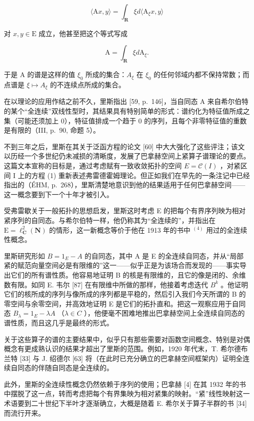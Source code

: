 \[
\langle \mathrm{A} x, y \rangle = \int_ {\mathbf {R}} \xi d \langle \mathrm{A} _ {\xi} x, y \rangle
\]

对 \(x, y \in \mathrm{E}\) 成立，他甚至把这个等式写成

\[
\mathrm{A} = \int_ {\mathbf {R}} \xi d \mathrm{A} _ {\xi}.
\]

于是 A 的谱是这样的值 \(\xi_{0}\) 所成的集合：\(A_{\xi}\) 在 \(\xi_{0}\) 的任何邻域内都不保持常数；而点谱是 \(\xi \mapsto A_{\xi}\) 的不连续点所成的集合。

在以理论的应用作结之前不久，里斯指出 [59, p.~146]，当自同态 A 来自希尔伯特的某个“全连续”双线性型时，其结果具有特别简单的形式：谱约化为特征值所成之集（可能还须加上 0），特征值排成一个趋于 0 的序列，且每个非零特征值的重数是有限的（III, p.~90, 命题 5）。


不到三年之后，里斯在其关于泛函方程的论文 [60] 中大大强化了这些评注；该文以历经一个多世纪仍未减损的清晰度，发展了巴拿赫空间上紧算子谱理论的要点。这篇文本宣称的目标是，通过考虑赋有一致收敛拓扑的空间 \(E = \mathcal{C}(I)\) ，对紧区间 I 上的方程 (1) 重新表述弗雷德霍姆理论。但正如我们在早先的一条注记中已经指出的（ÉHM, p.~268），里斯清楚地意识到他的结果适用于任何巴拿赫空间——这一概念要到下一个十年才被引入。

受弗雷歇关于一般拓扑的思想启发，里斯这时考虑 E 的把每个有界序列映为相对紧序列的自同态。与希尔伯特一样，他仍称其为“全连续的”，并指出在 \(\mathrm{E} = \ell_{\mathbf{C}}^{2}(\mathbf{N})\) 的情形，这一新概念等价于他在 1913 年的书中 \(^{(4)}\) 用过的全连续性概念。

里斯研究形如 \(B = 1_{E} - A\) 的自同态，其中 A 是 E 的全连续自同态，并从“局部紧的赋范向量空间必是有限维的”这一——似乎正是为该场合而发现的——事实导出它们的所有谱性质。他容易地证明 B 的核是有限维的，且它的像是闭的、余维数有限。如同 E. 韦尔 [87] 在有限维中所做的那样，他接着考虑迭代 \(B^{k}\) 。他证明它们的核所成的序列与像所成的序列都是平稳的，然后引入我们今天所谓的 B 的零空间与余零空间，并高效地证明 E 是它们的拓扑直和。把这一观察应用于自同态 \(B_{\lambda} = 1_{E} - \lambda A\) （\(\lambda \in C\) ），他便毫不困难地推出巴拿赫空间上全连续自同态的谱性质，而且这几乎是最终的形式。

关于这些算子的谱的主要结果中，似乎只有那些需要对函数空间概念、特别是对偶概念有更成熟认识的结果才超出了里斯的范围。例如，1920 年代末，T. 希尔德布兰特 [33] 与 J. 绍德尔 [63] 将（在此时已充分确立的巴拿赫空间框架内）证明全连续自同态的伴随自同态是全连续的。

此外，里斯的全连续性概念仍然依赖于序列的使用；巴拿赫 [4] 在其 1932 年的书中摆脱了这一点，转而考虑把每个有界集映为相对紧集的映射。“紧”线性映射这一术语要到二十世纪下半叶才逐渐确立，大概是随着 E. 希尔关于算子半群的书 [34] 而流行开来。

